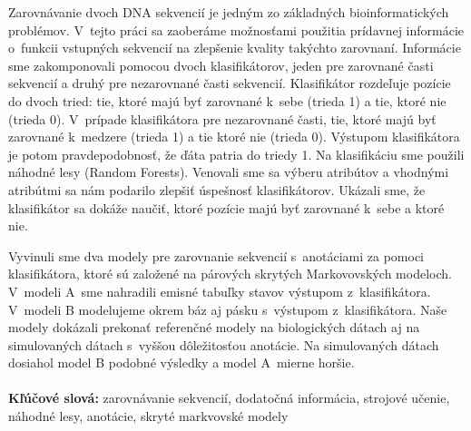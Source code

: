 Zarovnávanie dvoch DNA sekvencií je jedným zo základných
bioinformatických problémov. V~tejto práci sa zaoberáme možnosťami použitia prídavnej informácie o~funkcii vstupných sekvencií na zlepšenie kvality takýchto zarovnaní.
Informácie sme zakomponovali pomocou dvoch klasifikátorov, jeden pre zarovnané časti sekvencií a druhý pre nezarovnané časti sekvencií.
Klasifikátor rozdeľuje pozície do dvoch tried: tie, ktoré majú byť zarovnané k~sebe (trieda 1) a tie, ktoré nie (trieda 0). V~prípade klasifikátora pre nezarovnané časti, tie, ktoré majú byť zarovnané k~medzere (trieda 1) a tie ktoré nie (trieda 0). Výstupom klasifikátora je potom pravdepodobnosť, že ďáta patria do triedy 1. Na klasifikáciu sme použili náhodné lesy (Random Forests). Venovali sme sa výberu atribútov a vhodnými atribútmi sa nám podarilo zlepšiť úspešnosť klasifikátorov. Ukázali sme, že klasifikátor sa dokáže naučiť, ktoré pozície majú byť zarovnané k~sebe a ktoré nie.

Vyvinuli sme dva modely pre zarovnanie sekvencií s~anotáciami za pomoci klasifikátora, ktoré sú založené na párových skrytých Markovovských modeloch.
V~modeli A~sme nahradili emisné tabuľky stavov výstupom z~klasifikátora.
V~modeli B modelujeme okrem báz aj pásku s~výstupom z~klasifikátora.
Naše modely dokázali prekonať referenčné modely na biologických dátach aj na simulovaných dátach s~vyššou dôležitosťou anotácie. Na simulovaných dátach dosiahol model B podobné výsledky a model A~mierne horšie.
\\ \\
{\bf Kľúčové slová:} zarovnávanie sekvencií, dodatočná informácia, strojové učenie, náhodné lesy, anotácie, skryté markvovské modely
